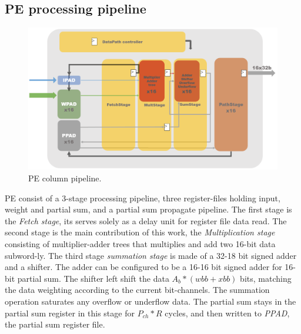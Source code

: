 \subsection{PE processing pipeline}
\begin{figure}[h]
    \centering
    \includegraphics[width=1\linewidth]{inc/4_proposed_architecture/figure/PE.png}
    \caption{PE column pipeline.}
    \label{fig:pe}
\end{figure}
PE consist of a 3-stage processing pipeline, three register-files holding input, weight and partial sum, and a partial sum propagate pipeline. The first stage is the \textit{Fetch stage}, its serves solely as a delay unit for register file data read. The second stage is the main contribution of this work, the \textit{Multiplication stage} consisting of multiplier-adder trees that multiplies and add two 16-bit data subword-ly. The third stage \textit{summation stage} is made of a 32-18 bit signed adder and a shifter. The adder can be configured to be a 16-16 bit signed adder for 16-bit partial sum. The shifter left shift the data $A_b*(wbb+xbb)$ bits, matching the data weighting according to the current bit-channels. The summation operation saturates any overflow or underflow data. The partial sum stays in the partial sum register in this stage for $P_{ch}*R$ cycles, and then written to \textit{PPAD}, the partial sum register file. \\
